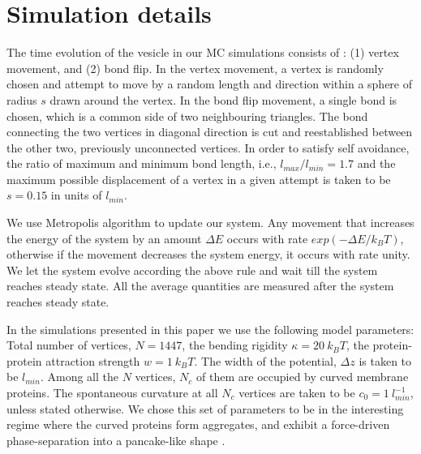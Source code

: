 \documentclass[pre,amsmath]{revtex4}
\begin{document}
\section{Simulation details}
\label{sec:simulation_detail}
The time evolution of the vesicle in our MC simulations consists of \cite{miha2019}: (1) vertex movement, and (2) bond flip. In the vertex movement, a vertex is randomly chosen and attempt to move by a random length and direction within a sphere of radius $s$ drawn around the vertex. In the bond flip movement, a single bond is chosen, which is a common side of two neighbouring triangles.  The bond connecting the two vertices in diagonal direction is cut and reestablished between the other two, previously unconnected vertices. In order to satisfy self avoidance, the ratio of maximum and minimum bond length, i.e., $l_{max}/l_{min}=1.7$ and the maximum possible displacement of a vertex in a given attempt is taken to be $s=0.15$ in units of $l_{min}$.
 
We use Metropolis algorithm to update our system. Any movement that increases the energy of the system by an amount $\Delta E$ occurs with rate $exp(- \Delta E/k_BT)$, otherwise if the movement decreases the system energy, it occurs with rate unity. We let the system evolve according the above rule and wait till the system reaches steady state. All the average quantities are measured after the system reaches steady state. 

In the simulations presented in this paper we use the following model parameters: Total number of vertices, $N=1447$, the bending rigidity $\kappa =20 ~k_B T$, the protein-protein attraction strength $w=1 ~k_BT$. The width of the potential, $\Delta z$ is taken to be $l_{min}$. Among all the $N$ vertices, $N_c$ of them are occupied by curved membrane proteins. The spontaneous curvature at all $N_c$ vertices are taken to be $c_0=1~ l^{-1}_{min}$, unless stated otherwise. We chose this set of parameters to be in the interesting regime where the curved proteins form aggregates, and exhibit a force-driven phase-separation into a pancake-like shape \cite{miha2019}.
\end{document}
